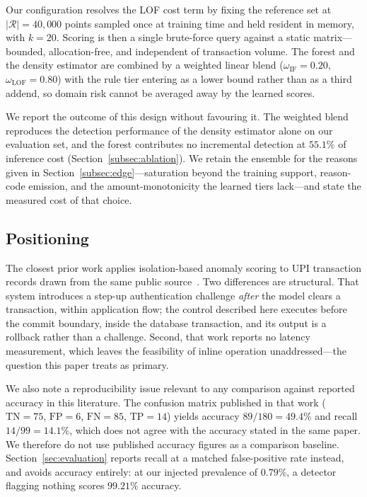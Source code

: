 \documentclass[conference]{IEEEtran}
\begin{document}
Our configuration resolves the LOF cost term by fixing the reference
set at $|\mathcal{R}| = 40{,}000$ points sampled once at training time
and held resident in memory, with $k=20$. Scoring is then a single
brute-force query against a static matrix---bounded, allocation-free,
and independent of transaction volume. The forest and the density
estimator are combined by a weighted linear blend
($\omega_{\mathrm{IF}} = 0.20$, $\omega_{\mathrm{LOF}} = 0.80$) with
the rule tier entering as a lower bound rather than as a third addend,
so domain risk cannot be averaged away by the learned scores.

We report the outcome of this design without favouring it. The weighted
blend reproduces the detection performance of the density estimator
alone on our evaluation set, and the forest contributes no incremental
detection at $55.1\%$ of inference cost
(Section~\ref{subsec:ablation}). We retain the ensemble for the reasons
given in Section~\ref{subsec:edge}---saturation beyond the training
support, reason-code emission, and the amount-monotonicity the learned
tiers lack---and state the measured cost of that choice.

\subsection{Positioning}
\label{subsec:rw_positioning}

The closest prior work applies isolation-based anomaly scoring to UPI
transaction records drawn from the same public
source~\cite{kumar2026}. Two differences are structural. That system
introduces a step-up authentication challenge \emph{after} the model
clears a transaction, within application flow; the control described
here executes before the commit boundary, inside the database
transaction, and its output is a rollback rather than a challenge.
Second, that work reports no latency measurement, which leaves the
feasibility of inline operation unaddressed---the question this paper
treats as primary.

We also note a reproducibility issue relevant to any comparison against
reported accuracy in this literature. The confusion matrix published in
that work ($\mathrm{TN}=75$, $\mathrm{FP}=6$, $\mathrm{FN}=85$,
$\mathrm{TP}=14$) yields accuracy $89/180 = 49.4\%$ and recall
$14/99 = 14.1\%$, which does not agree with the accuracy stated in the
same paper. We therefore do not use published accuracy figures as a
comparison baseline. Section~\ref{sec:evaluation} reports recall at a
matched false-positive rate instead, and avoids accuracy entirely: at
our injected prevalence of $0.79\%$, a detector flagging nothing scores
$99.21\%$ accuracy.
\end{document}
